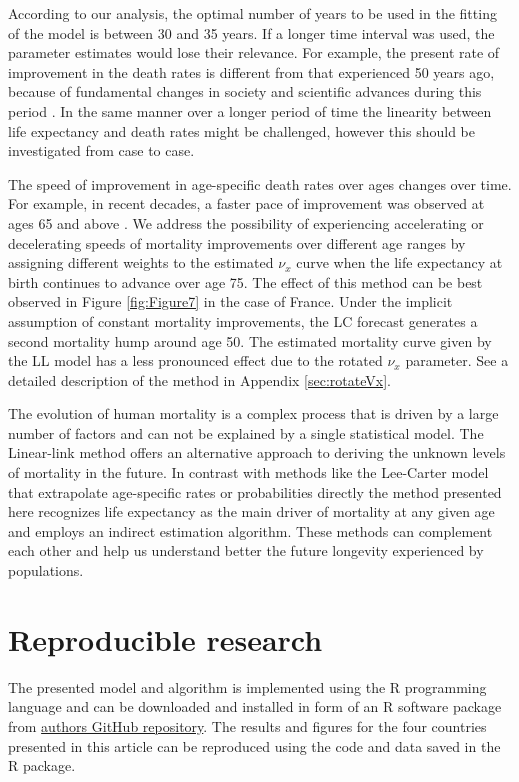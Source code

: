 \documentclass[risks,article,submit,moreauthors,pdftex]{Definitions/mdpi}
\begin{document}
According to our analysis, the optimal number of years to be used in the fitting of the model is between 30 and 35 years. If a longer time interval was used, the parameter estimates would lose their relevance. For example, the present rate of improvement in the death rates is different from that experienced 50 years ago, because of fundamental changes in society and scientific advances during this period \citep{bengtsson2006,rau2008}. In the same manner over a longer period of time the linearity between life expectancy and death rates might be challenged, however this should be investigated from case to case.

The speed of improvement in age-specific death rates over ages changes over time. For example, in recent decades, a faster pace of improvement was observed at ages 65 and above \citep{vaupel1997, shkolnikov2011}. We address the possibility of experiencing accelerating or decelerating speeds of mortality improvements over different age ranges by assigning different weights to the estimated $\nu_x$ curve when the life expectancy at birth continues to advance over age 75. The effect of this method can be best observed in Figure \ref{fig:Figure7} in the case of France. Under the implicit assumption of constant mortality improvements, the LC forecast generates a second mortality hump around age 50. The estimated mortality curve given by the LL model has a less pronounced effect due to the rotated $\nu_x$ parameter. See a detailed description of the method in Appendix \ref{sec:rotateVx}.  

The evolution of human mortality is a complex process that is driven by a large number of factors and can not be explained by a single statistical model. The Linear-link method offers an alternative approach to deriving the unknown levels of mortality in the future. In contrast with methods like the Lee-Carter model that extrapolate age-specific rates or probabilities directly the method presented here recognizes life expectancy as the main driver of mortality at any given age and employs an indirect estimation algorithm. These methods can complement each other and help us understand better the future longevity experienced by populations.  


\section*{Reproducible research}
The presented model and algorithm is implemented using the R programming language \citep{team2019r} and can be downloaded and installed in form of an R software package from \href{https://github.com/mpascariu/MortalityEstimate}{authors GitHub repository}. The results and figures for the four countries presented in this article can be reproduced using the code and data saved in the R package.
\end{document}
